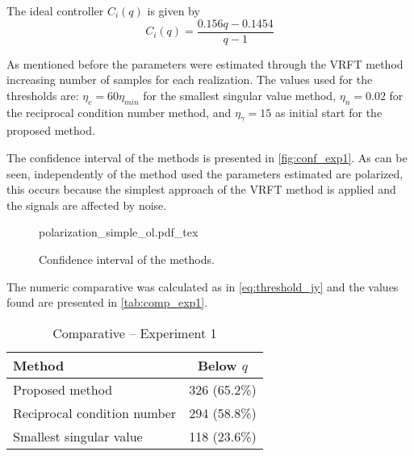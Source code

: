 The ideal controller $C_i(q)$ is given by
\begin{equation}
	C_i(q) = \frac{0.156q - 0.1454}{q-1}
\label{eq:tf_ci}
\end{equation}


As mentioned before the parameters were estimated through the VRFT method increasing number of samples for each realization.
The values used for the thresholds are: $\eta_c = 60\eta_{min} $ for the smallest singular value method, $\eta_n = 0.02$ for the reciprocal condition number method, and $\eta_\gamma = 15$ as initial start for the proposed method.


The confidence interval of the methods is presented in \autoref{fig:conf_exp1}.
As can be seen, independently of the method used the parameters estimated are polarized, this occurs because the simplest approach of the VRFT method is applied and the signals are affected by noise.
\begin{figure}[h!]
  \centering
  \def\svgwidth{\columnwidth}
  {\footnotesize{polarization_simple_ol.pdf_tex}}
  \caption{\label{fig:conf_exp1} Confidence interval of the methods.}
\end{figure}



The numeric comparative was calculated as in \eqref{eq:threshold_jy} and the values found are presented in \autoref{tab:comp_exp1}.
\begin{table}[h!]
  \caption{Comparative -- Experiment 1 \label{tab:comp_exp1}}
  \centering
  \begin{tabular}{lc}
  \toprule
  Method & Below $q$\\
  \midrule
  Proposed method & 326 (65.2\%) \\
  Reciprocal condition number & 294 (58.8\%) \\
  Smallest singular value & 118 (23.6\%) \\
  \bottomrule
  \end{tabular}
\end{table}

